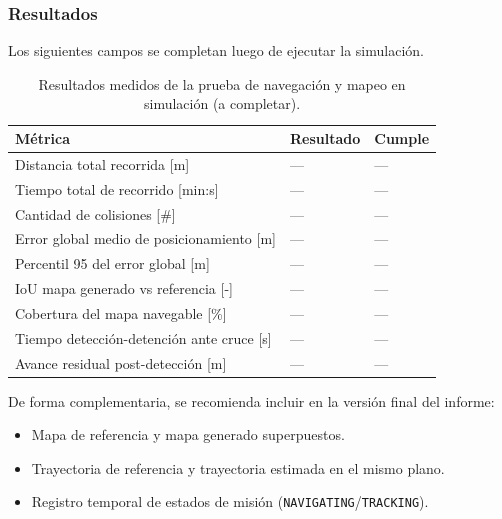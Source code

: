 \subsubsection{Resultados}

Los siguientes campos se completan luego de ejecutar la simulación.

\begin{table}[H]
\centering
\small
\begin{tabular}{p{8.8cm} p{2.2cm} p{2.8cm}}
\toprule
\textbf{Métrica} & \textbf{Resultado} & \textbf{Cumple} \\
\midrule
Distancia total recorrida [m] & --- & --- \\
Tiempo total de recorrido [min:s] & --- & --- \\
Cantidad de colisiones [\#] & --- & --- \\
Error global medio de posicionamiento [m] & --- & --- \\
Percentil 95 del error global [m] & --- & --- \\
IoU mapa generado vs referencia [-] & --- & --- \\
Cobertura del mapa navegable [\%] & --- & --- \\
Tiempo detección-detención ante cruce [s] & --- & --- \\
Avance residual post-detección [m] & --- & --- \\
\bottomrule
\end{tabular}
\caption{Resultados medidos de la prueba de navegación y mapeo en simulación (a completar).}
\label{tab:resultados_prueba_navegacion}
\end{table}

De forma complementaria, se recomienda incluir en la versión final del informe:
\begin{itemize}
    \item Mapa de referencia y mapa generado superpuestos.
    \item Trayectoria de referencia y trayectoria estimada en el mismo plano.
    \item Registro temporal de estados de misión (\texttt{NAVIGATING}/\texttt{TRACKING}).
\end{itemize}
